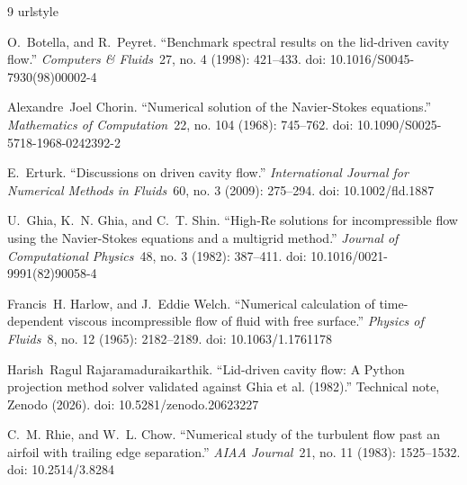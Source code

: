 \documentclass[CHICAGO]{USG}
\begin{document}
\begin{thebibliography}{9}
\providecommand{\natexlab}[1]{#1}
\providecommand{\url}[1]{\texttt{#1}}
\expandafter\ifx\csname urlstyle\endcsname\relax
 \providecommand{\doi}[1]{doi: #1}\else
 \providecommand{\doi}{doi: \begingroup \urlstyle{rm}\Url}\fi

O.~Botella, and R.~Peyret.
\newblock ``Benchmark spectral results on the lid-driven cavity flow.'' {\it
 Computers \& Fluids\/}~27, no. 4 (1998): 421--433. \doi{10.1016/S0045-7930(98)00002-4}

Alexandre~Joel Chorin.
\newblock ``Numerical solution of the {N}avier-{S}tokes equations.'' {\it
 Mathematics of Computation\/}~22, no. 104 (1968): 745--762. \doi{10.1090/S0025-5718-1968-0242392-2}

E.~Erturk.
\newblock ``Discussions on driven cavity flow.'' {\it International Journal
 for Numerical Methods in Fluids\/}~60, no. 3 (2009): 275--294. \doi{10.1002/fld.1887}

U.~Ghia, K.~N. Ghia, and C.~T. Shin.
\newblock ``High-{R}e solutions for incompressible flow using the
 {N}avier-{S}tokes equations and a multigrid method.'' {\it Journal of
 Computational Physics\/}~48, no. 3 (1982): 387--411. \doi{10.1016/0021-9991(82)90058-4}

Francis~H. Harlow, and J.~Eddie Welch.
\newblock ``Numerical calculation of time-dependent viscous incompressible flow
 of fluid with free surface.'' {\it Physics of Fluids\/}~8, no. 12 (1965):
 2182--2189. \doi{10.1063/1.1761178}

Harish~Ragul Rajaramaduraikarthik.
\newblock ``Lid-driven cavity flow: A {P}ython projection method solver
 validated against {G}hia et al. (1982).'' Technical note, Zenodo (2026). \doi{10.5281/zenodo.20623227}

C.~M. Rhie, and W.~L. Chow.
\newblock ``Numerical study of the turbulent flow past an airfoil with trailing
 edge separation.'' {\it AIAA Journal\/}~21, no. 11 (1983): 1525--1532. \doi{10.2514/3.8284}


\end{thebibliography}
\end{document}
